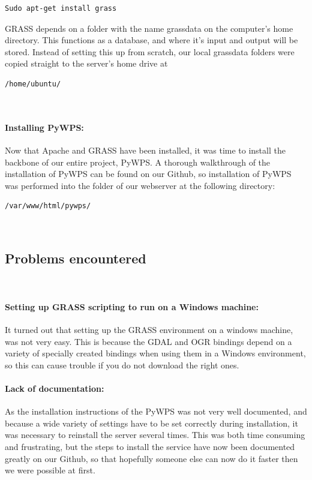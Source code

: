 \begin{lstlisting}
Sudo apt-get install grass
\end{lstlisting}

GRASS depends on a folder with the name grassdata on the computer's home directory. This functions as a database, and where it's input and output will be stored. Instead of setting this up from scratch, our local grassdata folders were copied straight to the server's home drive at

\begin{lstlisting} 
/home/ubuntu/
\end{lstlisting}\\

\paragraph{Installing PyWPS:} Now that Apache and GRASS have been installed, it was time to install the backbone of our entire project, PyWPS.
A thorough walkthrough of the installation of PyWPS can be found on our Github, so installation of PyWPS was performed into the folder of our webserver at the following directory:

\begin{lstlisting}
/var/www/html/pywps/
\end{lstlisting}\\

\subsection{Problems encountered}\\

\paragraph{Setting up GRASS scripting to run on a Windows machine:} It turned out that setting up the GRASS environment on a windows machine, was not very easy. This is because the GDAL and OGR bindings depend on a variety of specially created bindings when using them in a Windows environment, so this can cause trouble if you do not download the right ones.\\

\paragraph{Lack of documentation:} As the installation instructions of the PyWPS was not very well documented, and because a wide variety of settings have to be set correctly during installation, it was necessary to reinstall the server several times. This was both time consuming and frustrating, but the steps to install the service have now been documented greatly on our Github, so that hopefully someone else can now do it faster then we were possible at first. 

